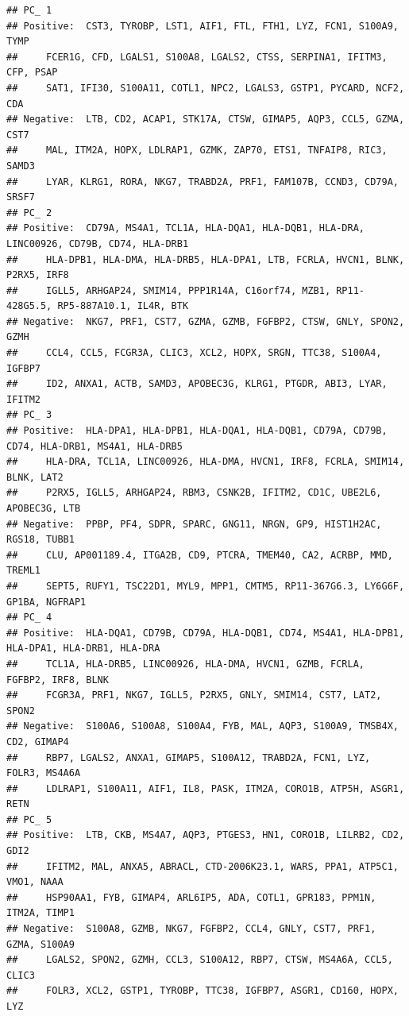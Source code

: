 \documentclass[
]{article}
\begin{document}
\begin{verbatim}
## PC_ 1 
## Positive:  CST3, TYROBP, LST1, AIF1, FTL, FTH1, LYZ, FCN1, S100A9, TYMP 
##     FCER1G, CFD, LGALS1, S100A8, LGALS2, CTSS, SERPINA1, IFITM3, CFP, PSAP 
##     SAT1, IFI30, S100A11, COTL1, NPC2, LGALS3, GSTP1, PYCARD, NCF2, CDA 
## Negative:  LTB, CD2, ACAP1, STK17A, CTSW, GIMAP5, AQP3, CCL5, GZMA, CST7 
##     MAL, ITM2A, HOPX, LDLRAP1, GZMK, ZAP70, ETS1, TNFAIP8, RIC3, SAMD3 
##     LYAR, KLRG1, RORA, NKG7, TRABD2A, PRF1, FAM107B, CCND3, CD79A, SRSF7 
## PC_ 2 
## Positive:  CD79A, MS4A1, TCL1A, HLA-DQA1, HLA-DQB1, HLA-DRA, LINC00926, CD79B, CD74, HLA-DRB1 
##     HLA-DPB1, HLA-DMA, HLA-DRB5, HLA-DPA1, LTB, FCRLA, HVCN1, BLNK, P2RX5, IRF8 
##     IGLL5, ARHGAP24, SMIM14, PPP1R14A, C16orf74, MZB1, RP11-428G5.5, RP5-887A10.1, IL4R, BTK 
## Negative:  NKG7, PRF1, CST7, GZMA, GZMB, FGFBP2, CTSW, GNLY, SPON2, GZMH 
##     CCL4, CCL5, FCGR3A, CLIC3, XCL2, HOPX, SRGN, TTC38, S100A4, IGFBP7 
##     ID2, ANXA1, ACTB, SAMD3, APOBEC3G, KLRG1, PTGDR, ABI3, LYAR, IFITM2 
## PC_ 3 
## Positive:  HLA-DPA1, HLA-DPB1, HLA-DQA1, HLA-DQB1, CD79A, CD79B, CD74, HLA-DRB1, MS4A1, HLA-DRB5 
##     HLA-DRA, TCL1A, LINC00926, HLA-DMA, HVCN1, IRF8, FCRLA, SMIM14, BLNK, LAT2 
##     P2RX5, IGLL5, ARHGAP24, RBM3, CSNK2B, IFITM2, CD1C, UBE2L6, APOBEC3G, LTB 
## Negative:  PPBP, PF4, SDPR, SPARC, GNG11, NRGN, GP9, HIST1H2AC, RGS18, TUBB1 
##     CLU, AP001189.4, ITGA2B, CD9, PTCRA, TMEM40, CA2, ACRBP, MMD, TREML1 
##     SEPT5, RUFY1, TSC22D1, MYL9, MPP1, CMTM5, RP11-367G6.3, LY6G6F, GP1BA, NGFRAP1 
## PC_ 4 
## Positive:  HLA-DQA1, CD79B, CD79A, HLA-DQB1, CD74, MS4A1, HLA-DPB1, HLA-DPA1, HLA-DRB1, HLA-DRA 
##     TCL1A, HLA-DRB5, LINC00926, HLA-DMA, HVCN1, GZMB, FCRLA, FGFBP2, IRF8, BLNK 
##     FCGR3A, PRF1, NKG7, IGLL5, P2RX5, GNLY, SMIM14, CST7, LAT2, SPON2 
## Negative:  S100A6, S100A8, S100A4, FYB, MAL, AQP3, S100A9, TMSB4X, CD2, GIMAP4 
##     RBP7, LGALS2, ANXA1, GIMAP5, S100A12, TRABD2A, FCN1, LYZ, FOLR3, MS4A6A 
##     LDLRAP1, S100A11, AIF1, IL8, PASK, ITM2A, CORO1B, ATP5H, ASGR1, RETN 
## PC_ 5 
## Positive:  LTB, CKB, MS4A7, AQP3, PTGES3, HN1, CORO1B, LILRB2, CD2, GDI2 
##     IFITM2, MAL, ANXA5, ABRACL, CTD-2006K23.1, WARS, PPA1, ATP5C1, VMO1, NAAA 
##     HSP90AA1, FYB, GIMAP4, ARL6IP5, ADA, COTL1, GPR183, PPM1N, ITM2A, TIMP1 
## Negative:  S100A8, GZMB, NKG7, FGFBP2, CCL4, GNLY, CST7, PRF1, GZMA, S100A9 
##     LGALS2, SPON2, GZMH, CCL3, S100A12, RBP7, CTSW, MS4A6A, CCL5, CLIC3 
##     FOLR3, XCL2, GSTP1, TYROBP, TTC38, IGFBP7, ASGR1, CD160, HOPX, LYZ
\end{verbatim}
\end{document}
